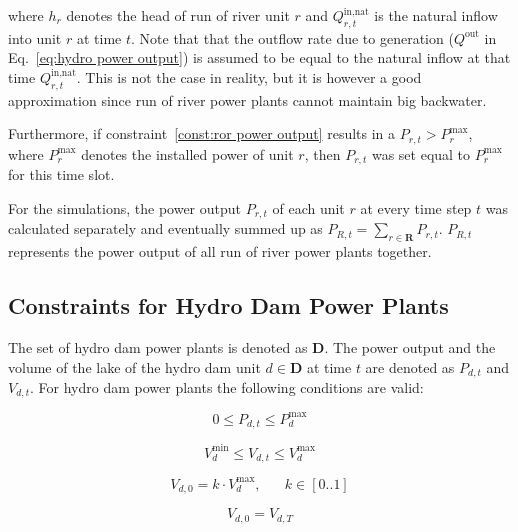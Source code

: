 \noindent where $h_{r}$ denotes the head of run of river unit $r$ and $Q^{\text{in,nat}}_{r, t}$ is the natural inflow into unit $r$ at time $t$. Note that that the outflow rate due to generation ($Q^{\text{out}}$ in Eq.~\eqref{eq:hydro power output}) is assumed to be equal to the natural inflow at that time $Q^{\text{in,nat}}_{r, t}$. This is not the case in reality, but it is however a good approximation since run of river power plants cannot maintain big backwater.

Furthermore, if constraint~\eqref{const:ror power output} results in a $ P_{r, t} > P^{\text{max}}_{r}$, where $P^{\text{max}}_{r}$ denotes the installed power of unit $r$, then $ P_{r, t}$ was set equal to $P^{\text{max}}_{r}$ for this time slot.

For the simulations, the power output $ P_{r, t}$ of each unit $r$ at every time step $t$ was calculated separately and eventually summed up as $ P_{R, t} = \sum_{r \in \textbf{R}} P_{r, t}$. $ P_{R, t}$ represents the power output of all run of river power plants together. 



\subsection{Constraints for Hydro Dam Power Plants}
The set of hydro dam power plants is denoted as $\textbf{D}$. The power output and the volume of the lake of the hydro dam unit $d \in \textbf{D}$ at time $t$ are denoted as $P_{d, t}$ and $V_{d, t}$. For hydro dam power plants the following conditions are valid: 

\setlength{\belowdisplayskip}{0pt} 
\setlength{\abovedisplayskip}{0pt} 

\begin{equation}\label{const:dam boundary power}
    0 \leq P_{d, t} \leq P^{\text{max}}_{d}
\end{equation}

\begin{equation}\label{const:dam boundary volume}
    V^{\text{min}}_{d} \leq V_{d, t} \leq V^{\text{max}}_{d}
\end{equation}

\begin{equation}\label{const:dam volume start}
    V_{d, 0} = k \cdot V^{\text{max}}_{d},  \,\,\,\,\,\,\,\,\,\,     k \in [0..1]
\end{equation}

\begin{equation}\label{const:dam volume start = end}
    V_{d, 0} = V_{d, T}
\end{equation}

